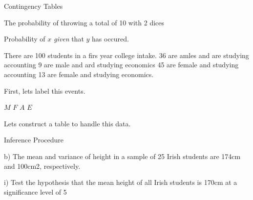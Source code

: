 Contingency Tables

The probability of throwing a total of 10 with 2 dices


Probability of $x$ \emph{given} that $y$ has occured.


There are 100 students in a firs year college intake. 36 are amles and are studying accounting
9 are male and ard studying economics
45 are female and studying accounting
13 are female and studying economics.

First, lets label this events.

$M$
$F$
$A$
$E$

Lets construct a table to handle this data.




Inference Procedure

b)	The mean and variance of height in a sample of 25 Irish students are 174cm and 100cm2, respectively.

i)	Test the hypothesis that the mean height of all Irish students is 170cm at a significance level of 5%

